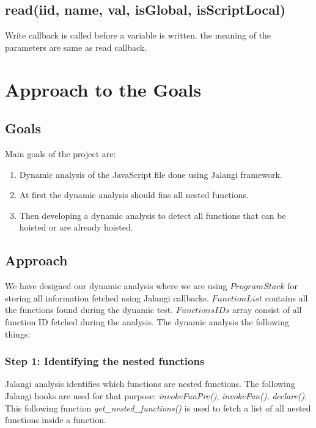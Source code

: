 \documentclass[accentcolor=tud0b,12pt,paper=a4]{tudreport}
\begin{document}
\section{read(iid, name, val, isGlobal, isScriptLocal)}
Write callback is called before a variable is written. the meaning of the parameters are same as read callback.


\chapter{Approach to the Goals}
\section{Goals}
Main goals of the project are: 
\begin{enumerate}
	\item Dynamic analysis of the JavaScript file done using Jalangi framework.
	\item At first the dynamic analysis should fins all nested functions.
	\item Then developing a dynamic analysis to detect all functions that can be hoisted or are already hoisted.
\end{enumerate}
\section{Approach}
We have designed our dynamic analysis where we are using $Program Stack$ for storing all information fetched using Jalangi callbacks. $Function List$ contains all the functions found during the dynamic test. $Functions IDs$ array consist of all function ID fetched during the analysis. The dynamic analysis the following things:
\subsection{Step 1: Identifying the nested functions}
Jalangi analysis identifies which functions are nested functions. The following Jalangi hooks are used for that purpose: \emph{invokeFunPre()}, \emph{invokeFun()}, \emph{declare()}. 
This following function \emph{get\_nested\_functions()} is used to fetch a list of all nested functions inside a function.
\end{document}
